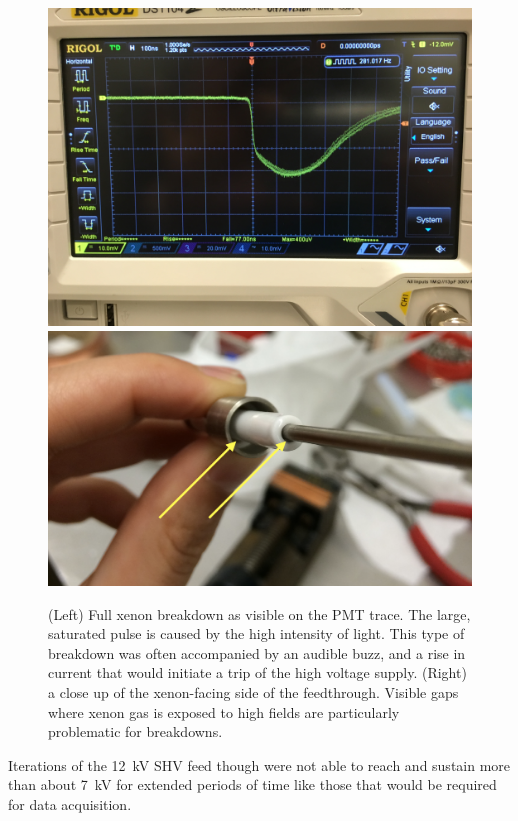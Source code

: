 \begin{figure}[htbp]
\begin{center}
\includegraphics[width=\halffig]{figures/testbed/breakdown.jpg}
\includegraphics[width=\halffig]{figures/testbed/ft_1and2_gasgaps.png}

\caption{(Left) Full xenon breakdown as visible on the PMT trace. The large, saturated pulse is caused by the high intensity of light. This type of breakdown was often accompanied by an audible buzz, and a rise in current that would initiate a trip of the high voltage supply. (Right) a close up of the xenon-facing side of the feedthrough. Visible gaps where xenon gas is exposed to high fields are particularly problematic for breakdowns.}
\label{fig:breakdown}
\end{center}
\end{figure}

Iterations of the 12~kV SHV feed though were not able to reach and sustain more than about 7~kV for extended periods of time like those that would be required for data acquisition.


